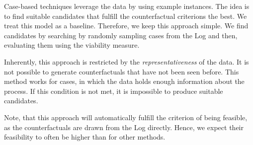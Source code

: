 \documentclass[./../../paper.tex]{subfiles}
\begin{document}
Case-based techniques leverage the data by using example instances. The idea is to find suitable candidates that fulfill the counterfactual criterions the best. We treat this model as a baseline. Therefore, we keep this approach simple. We find candidates by searching by randomly sampling cases from the Log and then, evaluating them using the viability measure.

Inherently, this approach is restricted by the \emph{representativeness} of the data. It is not possible to generate counterfactuals that have not been seen before. This method works for cases, in which the data holds enough information about the process. If this condition is not met, it is impossible to produce suitable candidates.

Note, that this approach will automatically fulfill the criterion of being feasible, as the counterfactuals are drawn from the Log directly. Hence, we expect their feasibility to often be higher than for other methods.
\end{document}
